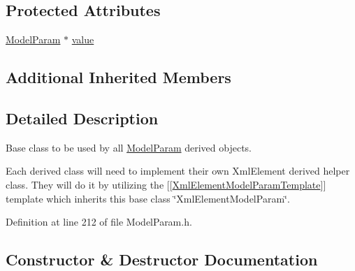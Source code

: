 \subsection*{Protected Attributes}
\begin{DoxyCompactItemize}
\item 
\hyperlink{class_k_k_m_l_l_1_1_model_param}{Model\+Param} $\ast$ \hyperlink{class_k_k_m_l_l_1_1_xml_element_model_param_a4a2019109b2b1eddb741f5f0f038889d}{value}
\end{DoxyCompactItemize}
\subsection*{Additional Inherited Members}


\subsection{Detailed Description}
Base class to be used by all \hyperlink{class_k_k_m_l_l_1_1_model_param}{Model\+Param} derived objects. 

Each derived class will need to implement their own Xml\+Element derived helper class. They will do it by utilizing the \mbox{[}\mbox{[}\hyperlink{class_k_k_m_l_l_1_1_xml_element_model_param_template}{Xml\+Element\+Model\+Param\+Template}\mbox{]}\mbox{]} template which inherits this base class \char`\"{}\+Xml\+Element\+Model\+Param\char`\"{}. 

Definition at line 212 of file Model\+Param.\+h.



\subsection{Constructor \& Destructor Documentation}
